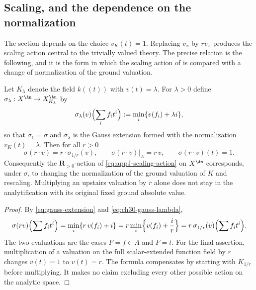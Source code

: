 \subsection{Scaling, and the dependence on the normalization}
\label{sec:ch30-gauss-scaling}

The section depends on the choice $v_K(t)=1$.  Replacing $v_x$ by
$rv_x$ produces the scaling action central to the trivially valued theory.
The precise relation is the following, and it is the form in which the
scaling action of  is compared with a
change of normalization of the ground valuation.

\begin{proposition}
\label{prop:ch30-gauss-scaling}
Let $K_\lambda$ denote the field $k((t))$ with $v(t)=\lambda$.
For $\lambda>0$ define
$\sigma_\lambda:X^{\An}\to X_{K_\lambda}^{\An}$ by
\begin{equation}
\label{eq:ch30-gauss-lambda}
 \sigma_\lambda(v)\Bigl(\sum_if_it^i\Bigr):=\min_i\{v(f_i)+\lambda i\},
\end{equation}
so that $\sigma_1=\sigma$ and $\sigma_\lambda$ is the Gauss extension
formed with the normalization $v_K(t)=\lambda$.  Then for all $r>0$
\begin{equation}
\label{eq:ch30-gauss-scaling}
 \sigma(r\cdot v)=r\cdot\sigma_{1/r}(v),
 \qquad
 \sigma(r\cdot v)|_A=r\,v,
 \qquad
 \sigma(r\cdot v)(t)=1 .
\end{equation}
Consequently the $\mathbf R_{>0}$-action of
\eqref{eq:appJ-scaling-action} on $X^{\An}$ corresponds, under
$\sigma$, to changing the normalization of the ground valuation of $K$
and rescaling.  Multiplying an upstairs valuation by $r$ alone
does not stay in the analytification with its original fixed ground
absolute value.
\end{proposition}

\begin{proof}
By \eqref{eq:gauss-extension} and \eqref{eq:ch30-gauss-lambda},
\[
 \sigma(rv)\Bigl(\sum f_it^i\Bigr)=\min_i\{r\,v(f_i)+i\}
 =r\min_i\Bigl\{v(f_i)+\frac ir\Bigr\}
 =r\,\sigma_{1/r}(v)\Bigl(\sum f_it^i\Bigr).
\]
The two evaluations are the cases $F=f\in A$ and $F=t$.  For the final assertion, multiplication of a valuation on the full
scalar-extended function field by $r$ changes $v(t)=1$ to $v(t)=r$.
The formula compensates by starting with $K_{1/r}$ before multiplying.
It makes no claim excluding every other possible action on the analytic
space.
\end{proof}


